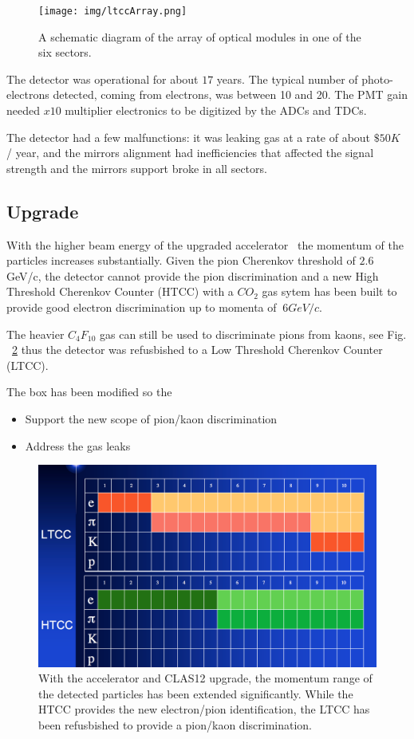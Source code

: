 \begin{figure}[hbt]
	\centering
	\texttt{[image: img/ltccArray.png]}
	\caption{A schematic diagram of the array of optical modules in one of the six sectors.}
	\label{fig:ltccArray}
\end{figure}

The detector was operational for about $17$ years. The typical number of photo-electrons detected, coming from electrons, was between 10 and 20.
The PMT gain needed $x10$ multiplier electronics to be digitized by the ADCs and TDCs.

The detector had a few malfunctions: it was leaking gas at a rate of about $\$50K$ / year, and the mirrors alignment had inefficiencies that affected
the signal strength and the mirrors support broke in all sectors.


\subsection{Upgrade}

With the higher beam energy of the upgraded accelerator~\cite{TDR12} the momentum of the particles increases substantially.
Given the pion Cherenkov threshold of $2.6$ GeV/c, the detector cannot provide the pion discrimination and a new
High Threshold Cherenkov Counter (HTCC) with a $CO_2$ gas sytem has been built to provide good electron discrimination up to momenta of $~6 GeV/c$.

The heavier $C_4F_{10}$ gas can still be used to discriminate pions from kaons, see Fig. ~\ref{fig:newScope} thus the detector was refusbished
to a Low Threshold Cherenkov Counter (LTCC).

The box has been modified so the

\begin{itemize}
	\item Support the new scope of pion/kaon discrimination
	\item Address the gas leaks
\end{itemize}

\begin{figure}[hbt]
	\centering
	\includegraphics[width=1.0\columnwidth,keepaspectratio]{img/newScope.png}
	\caption{With the accelerator and CLAS12 upgrade, the momentum range of the detected particles has been extended significantly. While the HTCC
            provides the new electron/pion identification, the LTCC has been refusbished to provide a pion/kaon discrimination.}
	\label{fig:newScope}
\end{figure}
